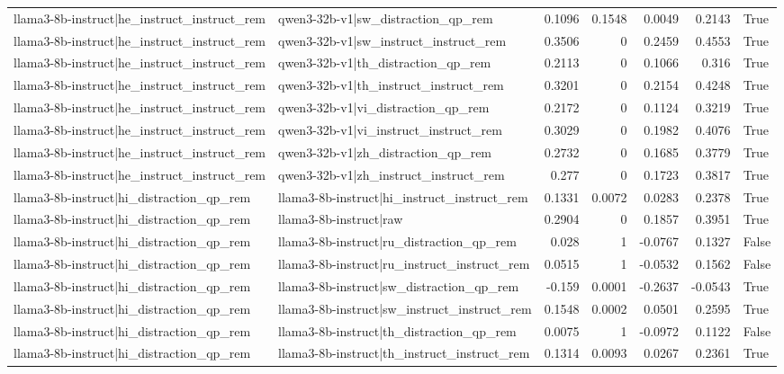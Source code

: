 \begin{table}
\begin{tabular}{l l r r r r l}
llama3-8b-instruct|he_instruct_instruct_rem & qwen3-32b-v1|sw_distraction_qp_rem & 0.1096 & 0.1548 & 0.0049 & 0.2143 & True \\
llama3-8b-instruct|he_instruct_instruct_rem & qwen3-32b-v1|sw_instruct_instruct_rem & 0.3506 & 0 & 0.2459 & 0.4553 & True \\
llama3-8b-instruct|he_instruct_instruct_rem & qwen3-32b-v1|th_distraction_qp_rem & 0.2113 & 0 & 0.1066 & 0.316 & True \\
llama3-8b-instruct|he_instruct_instruct_rem & qwen3-32b-v1|th_instruct_instruct_rem & 0.3201 & 0 & 0.2154 & 0.4248 & True \\
llama3-8b-instruct|he_instruct_instruct_rem & qwen3-32b-v1|vi_distraction_qp_rem & 0.2172 & 0 & 0.1124 & 0.3219 & True \\
llama3-8b-instruct|he_instruct_instruct_rem & qwen3-32b-v1|vi_instruct_instruct_rem & 0.3029 & 0 & 0.1982 & 0.4076 & True \\
llama3-8b-instruct|he_instruct_instruct_rem & qwen3-32b-v1|zh_distraction_qp_rem & 0.2732 & 0 & 0.1685 & 0.3779 & True \\
llama3-8b-instruct|he_instruct_instruct_rem & qwen3-32b-v1|zh_instruct_instruct_rem & 0.277 & 0 & 0.1723 & 0.3817 & True \\
llama3-8b-instruct|hi_distraction_qp_rem & llama3-8b-instruct|hi_instruct_instruct_rem & 0.1331 & 0.0072 & 0.0283 & 0.2378 & True \\
llama3-8b-instruct|hi_distraction_qp_rem & llama3-8b-instruct|raw & 0.2904 & 0 & 0.1857 & 0.3951 & True \\
llama3-8b-instruct|hi_distraction_qp_rem & llama3-8b-instruct|ru_distraction_qp_rem & 0.028 & 1 & -0.0767 & 0.1327 & False \\
llama3-8b-instruct|hi_distraction_qp_rem & llama3-8b-instruct|ru_instruct_instruct_rem & 0.0515 & 1 & -0.0532 & 0.1562 & False \\
llama3-8b-instruct|hi_distraction_qp_rem & llama3-8b-instruct|sw_distraction_qp_rem & -0.159 & 0.0001 & -0.2637 & -0.0543 & True \\
llama3-8b-instruct|hi_distraction_qp_rem & llama3-8b-instruct|sw_instruct_instruct_rem & 0.1548 & 0.0002 & 0.0501 & 0.2595 & True \\
llama3-8b-instruct|hi_distraction_qp_rem & llama3-8b-instruct|th_distraction_qp_rem & 0.0075 & 1 & -0.0972 & 0.1122 & False \\
llama3-8b-instruct|hi_distraction_qp_rem & llama3-8b-instruct|th_instruct_instruct_rem & 0.1314 & 0.0093 & 0.0267 & 0.2361 & True \\

\end{tabular}
\end{table}
